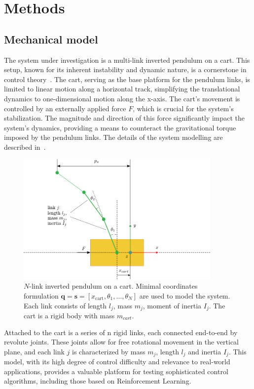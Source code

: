\section{Methods}

\subsection{Mechanical model}

The system under investigation is a multi-link inverted pendulum on a cart. This setup, known for its inherent instability and dynamic nature, is a cornerstone in control theory~\cite{Fantoni2001Nonlinear}. The cart, serving as the base platform for the pendulum links, is limited to linear motion along a horizontal track, simplifying the translational dynamics to one-dimensional motion along the x-axis. The cart's movement is controlled by an externally applied force $F$, which is crucial for the system's stabilization. The magnitude and direction of this force significantly impact the system's dynamics, providing a means to counteract the gravitational torque imposed by the pendulum links. The details of the system modelling are described in~\cite{manzl2023relrl}.

\begin{figure}[h]
\centering
\includegraphics[width=10cm]{Figures/cart_pole_model.pdf}
\caption{$N$-link inverted pendulum on a cart. Minimal coordinates formulation $\mathbf{q} = \mathbf{s} =  [x_{\text{cart}}, \theta_1, \ldots, \theta_N]$ are used to model the system. Each link consists of length $l_j$, mass $m_j$, moment of inertia $I_j$. The cart is a rigid body with mass $m_{cart}$.}
\label{fig: n-pendulum on a cart}
\end{figure}

Attached to the cart is a series of n rigid links, each connected end-to-end by revolute joints. These joints allow for free rotational movement in the vertical plane, and each link 
$j$ is characterized by mass $m_j$, length $l_j$ and inertia $I_j$.
This model, with its high degree of control difficulty and relevance to real-world applications, provides a valuable platform for testing sophisticated control algorithms, including those based on Reinforcement Learning.

